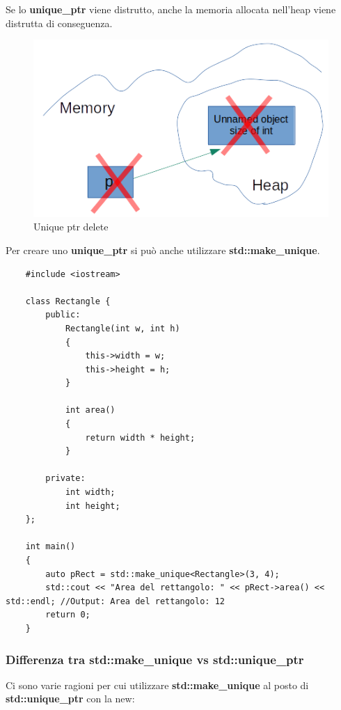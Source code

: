 \textsf{\small Se lo \textbf{unique\_ptr} viene distrutto, anche la memoria allocata nell'heap viene distrutta di conseguenza.} \\

\begin{figure}[H]
	\centering
	\includegraphics[width=1\textwidth, height=1\textheight, keepaspectratio]{./imgs/unique_ptr_delete.png}
	\caption{Unique ptr delete}
	\label{fig:unique_ptr_delete}
\end{figure}

\textsf{\small Per creare uno \textbf{unique\_ptr} si può anche utilizzare \textbf{std::make\_unique}.} \\

\begin{lstlisting}
	#include <iostream>
	
	class Rectangle {
		public:
			Rectangle(int w, int h)
			{
				this->width = w;
				this->height = h;
			}
		
			int area()
			{
				return width * height;
			}
		
		private:
			int width;
			int height;
	};

	int main()
	{
		auto pRect = std::make_unique<Rectangle>(3, 4);
		std::cout << "Area del rettangolo: " << pRect->area() << std::endl; //Output: Area del rettangolo: 12
		return 0;
	}
\end{lstlisting}

\subsubsection{Differenza tra std::make\_unique vs std::unique\_ptr}

\textsf{\small Ci sono varie ragioni per cui utilizzare \textbf{std::make\_unique} al posto di \textbf{std::unique\_ptr} con la new: } \\

